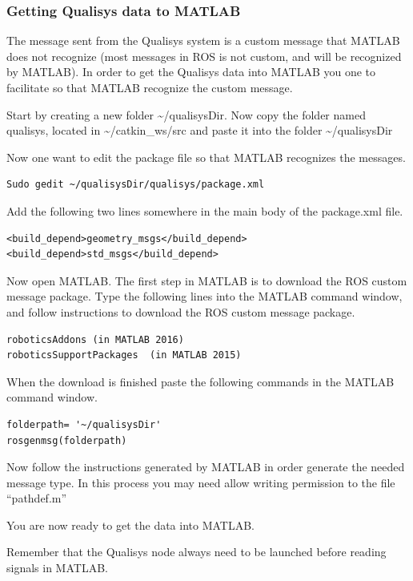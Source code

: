 \documentclass[a4paper,english]{report}
\begin{document}
\subsubsection{Getting Qualisys data to MATLAB}

The message sent from the Qualisys system is a custom message that MATLAB does not recognize (most messages in ROS is not custom, and will be recognized by MATLAB). In order to get the Qualisys data into MATLAB you one to facilitate so that MATLAB recognize the custom message.

Start by creating a new folder \textasciitilde{}/qualisysDir. Now copy the folder named qualisys, located in \textasciitilde{}/catkin\_ws/src and paste it into the folder \textasciitilde{}/qualisysDir

Now one want to edit the package file so that MATLAB recognizes the messages.

\begin{verbatim}Sudo gedit ~/qualisysDir/qualisys/package.xml\end{verbatim}

Add the following two lines somewhere in the main body of the package.xml file.

\begin{verbatim}<build_depend>geometry_msgs</build_depend>
<build_depend>std_msgs</build_depend>\end{verbatim}

Now open MATLAB. The first step in MATLAB is to download the ROS custom message package. Type the following lines into the MATLAB command window, and follow instructions to download the ROS custom message package.

\begin{verbatim}roboticsAddons (in MATLAB 2016)
roboticsSupportPackages  (in MATLAB 2015)\end{verbatim}

When the download is finished paste the following commands in the MATLAB command window.

\begin{verbatim}folderpath= '~/qualisysDir'
rosgenmsg(folderpath)\end{verbatim}

Now follow the instructions generated by MATLAB in order generate the needed message type. In this process you may need allow writing permission to the file ``pathdef.m''

You are now ready to get the data into MATLAB.

Remember that the Qualisys node always need to be launched before reading signals in MATLAB.
\end{document}
